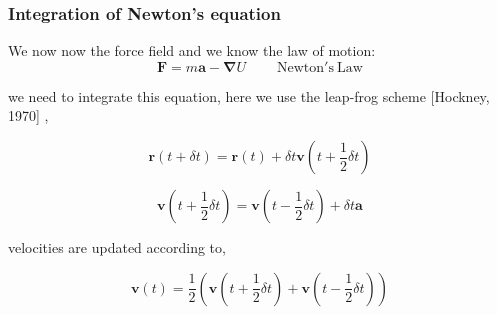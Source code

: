 \documentclass{beamer}
\begin{document}
\begin{frame}\frametitle{Integration of Newton's equation}

We now now the force field and we know the law of motion:
  \begin{equation}
	  \mathbf{F}= m \mathbf{a} - \mathbf{\nabla} U      \mathrm{~~~~~~~~~~Newton's~ Law}
  \end{equation}

  we need to integrate this equation, here we use the leap-frog scheme [Hockney, 1970] ,

  \begin{equation}
	  \mathbf{r} (t+\delta t)= \mathbf{r} (t) + \delta t  \mathbf{v} (t+ \frac{1}{2} \delta t)
  \end{equation}

  \begin{equation}
	  \mathbf{v} (t+ \frac{1}{2}\delta t)= \mathbf{v} (t- \frac{1}{2} \delta t) + \delta t \mathbf{a}
  \end{equation}

velocities are updated according to, 

  \begin{equation}
	  \mathbf{v} (t)= \frac{1}{2} \left( \mathbf{v} (t+ \frac{1}{2} \delta t) + \mathbf{v} (t- \frac{1}{2} \delta t)  \right)
  \end{equation}

\end{frame}
\end{document}
